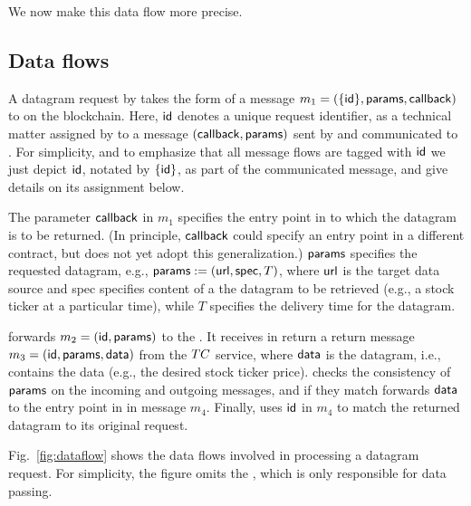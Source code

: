 We now make this data flow more precise. 

\subsection{Data flows}

A datagram request by \reqcont takes the form of a message $m_1 = (\{{\sf id}\}, {\sf params}, {\sf callback})$ to \tcont on the blockchain. 
Here, ${\sf id}$ denotes a unique request identifier, as a technical matter assigned by \tcont to a message $({\sf callback}, {\sf params})$ sent by \reqcont and communicated to \reqcont.  For simplicity, and to emphasize that all message flows are tagged with ${\sf id}$ we just depict ${\sf id}$, notated by $\{{\sf id}\}$, as part of the communicated message, and give details on its assignment below.

The parameter ${\sf callback}$ in $m_1$ specifies the entry point in \reqcont to which the datagram is to be returned. (In principle, ${\sf callback}$ could specify an entry point in a different contract, but \tc does not yet adopt this generalization.) ${\sf params}$ specifies the requested datagram, e.g., ${\sf params} := ({{\sf url}}, {\sf spec}, T)$, where ${{\sf url}}$ is the target data source and {\sf spec} specifies content of a the datagram to be retrieved (e.g., a stock ticker at a particular time), while $T$ specifies the delivery time for the datagram. 

\tcont forwards $m_2 = ({\sf id}, {\sf params})$ to the \encname. It receives in return a return message $m_3 = ({\sf id}, {\sf params}, {\sf data})$ from the $TC$ service, where ${\sf data}$ is the datagram, i.e., contains the data (e.g., the desired stock ticker price). \tcont checks the consistency of ${\sf params}$ on the incoming and outgoing messages, and if they match forwards ${\sf data}$ to the entry point \dgcallback in \reqcont in message $m_4$. Finally, \reqcont uses ${\sf id}$ in $m_4$ to match the returned datagram to its original request.

Fig.~\ref{fig:dataflow} shows the data flows involved in processing a datagram request. For simplicity, the figure omits the \medname, which is only responsible for data passing.


